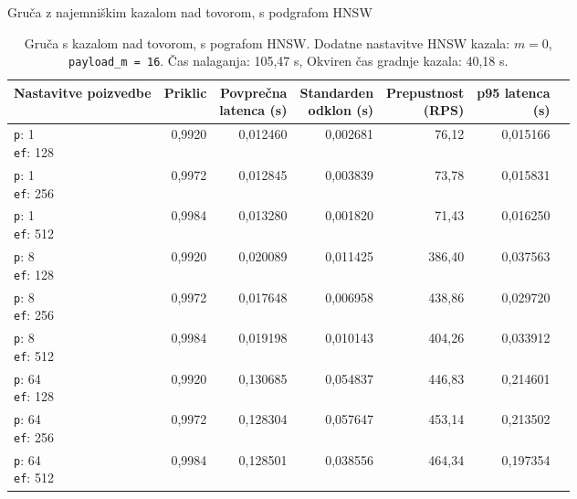 \begin{table}[htbp]
  \centering
\small
  \caption{Gruča z najemniškim kazalom nad tovorom, s podgrafom HNSW}
  \label{tab:cluster-2cpu-4ram:tenant-subgraph:qdrant-dipl-baseline-tenant-subgraph-m-16-ef-128-random-768-100-tenants-extended-upload-2026-08-17-15-29-58.json}
  \begin{tabularx}{\textwidth}{Xrrrrrr}
    \toprule
    Nastavitve poizvedbe & Priklic & \makecell{Povprečna\\latenca (s)} & \makecell{Standarden\\odklon (s)} & \makecell{Prepustnost\\(RPS)} & \makecell{p95 latenca\\(s)}  \\
    \midrule
    \makecell{\texttt{p}: 1\\\texttt{ef}: 128} & 0,9920 & 0,012460 & 0,002681 & 76,12 & 0,015166 \\
    \makecell{\texttt{p}: 1\\\texttt{ef}: 256} & 0,9972 & 0,012845 & 0,003839 & 73,78 & 0,015831 \\
    \makecell{\texttt{p}: 1\\\texttt{ef}: 512} & 0,9984 & 0,013280 & 0,001820 & 71,43 & 0,016250 \\
    \makecell{\texttt{p}: 8\\\texttt{ef}: 128} & 0,9920 & 0,020089 & 0,011425 & 386,40 & 0,037563 \\
    \makecell{\texttt{p}: 8\\\texttt{ef}: 256} & 0,9972 & 0,017648 & 0,006958 & 438,86 & 0,029720 \\
    \makecell{\texttt{p}: 8\\\texttt{ef}: 512} & 0,9984 & 0,019198 & 0,010143 & 404,26 & 0,033912 \\
    \makecell{\texttt{p}: 64\\\texttt{ef}: 128} & 0,9920 & 0,130685 & 0,054837 & 446,83 & 0,214601 \\
    \makecell{\texttt{p}: 64\\\texttt{ef}: 256} & 0,9972 & 0,128304 & 0,057647 & 453,14 & 0,213502 \\
    \makecell{\texttt{p}: 64\\\texttt{ef}: 512} & 0,9984 & 0,128501 & 0,038556 & 464,34 & 0,197354 \\
    \bottomrule
  \end{tabularx}
\caption* {Gruča s kazalom nad tovorom, s pografom HNSW. Dodatne nastavitve HNSW kazala: $m = 0$, \texttt{payload\_m = 16}. Čas nalaganja: 105,47 s, Okviren čas gradnje kazala: 40,18 s.}\end{table}


